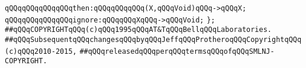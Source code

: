 \verb|qQQqqQQqqQQqqQQqthen:qQQqqQQqqQQq(X,qQQqVoid)qQQq->qQQqX;|\newline
\verb|qQQqqQQqqQQqqQQqignore:qQQqqQQqXqQQq->qQQqVoid;|\newline
\newline
\verb|};|\newline
\newline
\newline
\newline
\verb|##qQQqCOPYRIGHTqQQq(c)qQQq1995qQQqAT&TqQQqBellqQQqLaboratories.|\newline
\verb|##qQQqSubsequentqQQqchangesqQQqbyqQQqJeffqQQqProtheroqQQqCopyrightqQQq(c)qQQq2010-2015,|\newline
\verb|##qQQqreleasedqQQqperqQQqtermsqQQqofqQQqSMLNJ-COPYRIGHT.|\newline

